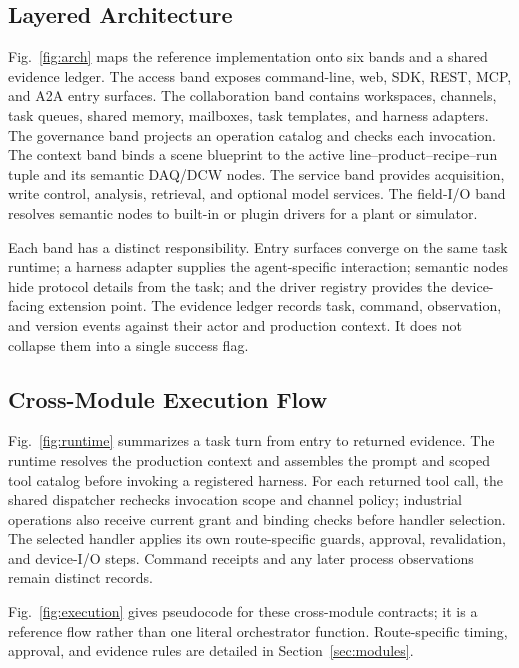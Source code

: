 \subsection{Layered Architecture}
\label{sec:layers}
\label{sec:arch}
Fig.~\ref{fig:arch} maps the reference implementation onto six bands and a
shared evidence ledger. The access band exposes command-line, web, SDK, REST,
MCP, and A2A entry surfaces. The collaboration band contains workspaces,
channels, task queues, shared memory, mailboxes, task templates, and
harness adapters. The governance band projects an operation catalog and
checks each invocation. The context band binds a scene blueprint to the
active line--product--recipe--run tuple and its semantic DAQ/DCW nodes. The
service band provides acquisition, write control, analysis, retrieval, and
optional model services. The field-I/O band resolves semantic nodes to
built-in or plugin drivers for a plant or simulator.

Each band has a distinct responsibility. Entry surfaces converge on the
same task runtime; a harness adapter supplies the agent-specific interaction;
semantic nodes hide protocol details from the task; and the driver registry
provides the device-facing extension point. The evidence ledger records
task, command, observation, and version events against their actor and
production context. It does not collapse them into a single success flag.

\subsection{Cross-Module Execution Flow}
\label{sec:executionflow}
Fig.~\ref{fig:runtime} summarizes a task turn from entry to returned
evidence. The runtime resolves the production context and assembles the
prompt and scoped tool catalog before invoking a registered harness. For
each returned tool call, the shared dispatcher rechecks invocation scope
and channel policy; industrial operations also receive current grant and
binding checks before handler selection. The selected handler applies its
own route-specific guards, approval, revalidation, and device-I/O steps.
Command receipts and any later process observations remain distinct records.

Fig.~\ref{fig:execution} gives pseudocode for these cross-module contracts;
it is a reference flow rather than one literal orchestrator function.
Route-specific timing, approval, and evidence rules are detailed in
Section~\ref{sec:modules}.

